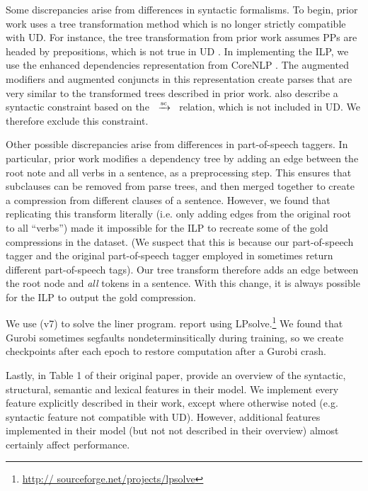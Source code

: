 \documentclass[11pt,a4paper]{article}
\newcommand{\rdep}[1]{\ $\xrightarrow{\text{\tiny #1}}$\ }
\begin{document}
Some discrepancies arise from differences in syntactic formalisms. To begin, prior work uses a tree transformation method which is no longer strictly compatible with UD. For instance, the tree transformation from prior work assumes PPs are headed by prepositions, which is not true in UD \cite{Schuster2016EnhancedEU}. In implementing the ILP, we use the enhanced dependencies representation from CoreNLP \cite{Schuster2016EnhancedEU}. The augmented modifiers and augmented conjuncts in this representation create parses that are very similar to the transformed trees described in prior work. \citet{filippova2008dependency} also describe a syntactic constraint based on the \rdep{sc} relation, which is not included in UD. We therefore exclude this constraint.

Other possible discrepancies arise from differences in part-of-speech taggers. In particular, prior work modifies a dependency tree by adding an edge between the root note and all verbs in a sentence, as a preprocessing step. This ensures that subclauses can be removed from parse trees, and then merged together to create a compression from different clauses of a sentence. However, we found that replicating this transform literally (i.e. only adding edges from the original root to all ``verbs'') made it impossible for the ILP to recreate some of the gold compressions in the dataset. (We suspect that this is because our part-of-speech tagger and the original part-of-speech tagger employed in \citet{filippova2013overcoming} sometimes return different part-of-speech tags). Our tree transform therefore adds an edge between the root node and \textit{all} tokens in a sentence. With this change, it is always possible for the ILP to output the gold compression.

We use \citet{gurobi} (v7) to solve the liner program. \citet{filippova2008dependency} report using LPsolve.\footnote{\url{http://
sourceforge.net/projects/lpsolve}}  We found that Gurobi sometimes segfaults nondeterminsitically during training, so we create checkpoints after each epoch to restore computation after a Gurobi crash. 

Lastly, in Table 1 of their original paper, \citet{filippova2013overcoming} provide an overview of the syntactic, structural, semantic and lexical features in their model. We implement every feature explicitly described in their work, except where otherwise noted (e.g. syntactic feature not compatible with UD). However, additional features implemented in their model (but not not described in their overview) almost certainly affect performance. 



\end{document}
